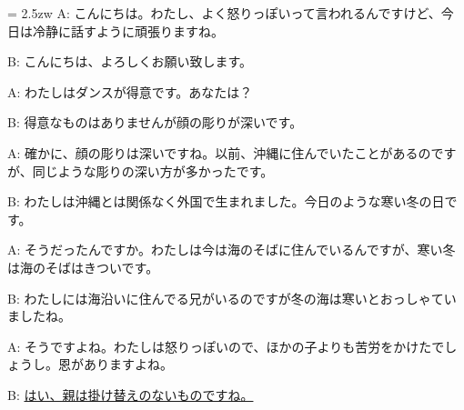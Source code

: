 \documentclass[11pt]{amsart}
\title{}
\author{}
\newenvironment{hangall}[1]{\hangindent = 2.5zw\everypar{\hangindent = 2.5zw}}{}
\begin{document}
\maketitle
\begin{hangall}{}%
A: こんにちは。わたし、よく怒りっぽいって言われるんですけど、今日は冷静に話すように頑張りますね。

B: こんにちは、よろしくお願い致します。

A: わたしはダンスが得意です。あなたは？

B: 得意なものはありませんが顔の彫りが深いです。

A: 確かに、顔の彫りは深いですね。以前、沖縄に住んでいたことがあるのですが、同じような彫りの深い方が多かったです。

B: わたしは沖縄とは関係なく外国で生まれました。今日のような寒い冬の日です。

A: そうだったんですか。わたしは今は海のそばに住んでいるんですが、寒い冬は海のそばはきついです。

B: わたしには海沿いに住んでる兄がいるのですが冬の海は寒いとおっしゃていましたね。

A: そうですよね。わたしは怒りっぽいので、ほかの子よりも苦労をかけたでしょうし。恩がありますよね。

B: \ul{はい、親は掛け替えのないものですね。}\end{hangall}
\end{document}

